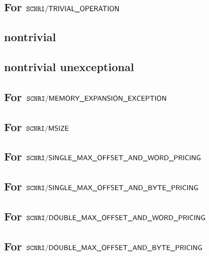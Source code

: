 \subsection{For $\texttt{SCNRI}\textsf{/}{\textsf{TRIVIAL\_OPERATION}}$}                  

\subsection{nontrivial}                                          
\subsection{nontrivial unexceptional}                            
                    
\subsection{For $\texttt{SCNRI}\textsf{/}{\textsf{MEMORY\_EXPANSION\_EXCEPTION}}$}          
\subsection{For $\texttt{SCNRI}\textsf{/}{\textsf{MSIZE}}$}                             

                    
\subsection{For $\texttt{SCNRI}\textsf{/}{\textsf{SINGLE\_MAX\_OFFSET\_AND\_WORD\_PRICING}}$}      
\subsection{For $\texttt{SCNRI}\textsf{/}{\textsf{SINGLE\_MAX\_OFFSET\_AND\_BYTE\_PRICING}}$}              
\subsection{For $\texttt{SCNRI}\textsf{/}{\textsf{DOUBLE\_MAX\_OFFSET\_AND\_WORD\_PRICING}}$}      
\subsection{For $\texttt{SCNRI}\textsf{/}{\textsf{DOUBLE\_MAX\_OFFSET\_AND\_BYTE\_PRICING}}$}      









